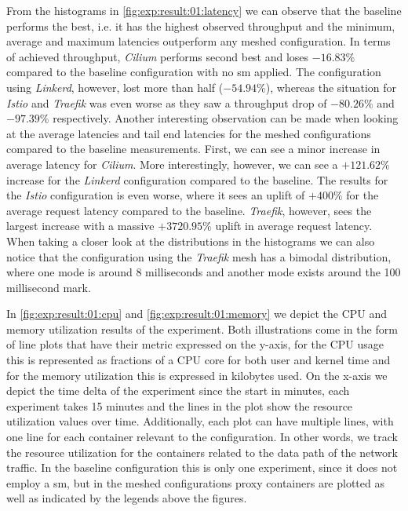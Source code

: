 From the histograms in \cref{fig:exp:result:01:latency} we can observe that the baseline performs the best, i.e. it has the highest observed throughput and the minimum, average and maximum latencies outperform any meshed configuration. In terms of achieved throughput, \textit{Cilium} performs second best and loses $-16.83\%$ compared to the baseline configuration with no \gls{sm} applied. The configuration using \textit{Linkerd}, however, lost more than half ($-54.94\%$), whereas the situation for \textit{Istio} and \textit{Traefik} was even worse as they saw a throughput drop of $-80.26\%$ and $-97.39\%$ respectively. Another interesting observation can be made when looking at the average latencies and tail end latencies for the meshed configurations compared to the baseline measurements. First, we can see a minor increase in average latency for \textit{Cilium}. More interestingly, however, we can see a $+121.62\%$ increase for the \textit{Linkerd} configuration compared to the baseline. The results for the \textit{Istio} configuration is even worse, where it sees an uplift of $+400\%$ for the average request latency compared to the baseline. \textit{Traefik}, however, sees the largest increase with a massive $+3720.95\%$ uplift in average request latency. When taking a closer look at the distributions in the histograms we can also notice that the configuration using the \textit{Traefik} mesh has a bimodal distribution, where one mode is around 8 milliseconds and another mode exists around the 100 millisecond mark.

In \cref{fig:exp:result:01:cpu} and \cref{fig:exp:result:01:memory} we depict the CPU and memory utilization results of the experiment. Both illustrations come in the form of line plots that have their metric expressed on the y-axis, for the CPU usage this is represented as fractions of a CPU core for both user and kernel time and for the memory utilization this is expressed in kilobytes used. On the x-axis we depict the time delta of the experiment since the start in minutes, each experiment takes 15 minutes and the lines in the plot show the resource utilization values over time. Additionally, each plot can have multiple lines, with one line for each container relevant to the configuration. In other words, we track the resource utilization for the containers related to the data path of the network traffic. In the baseline configuration this is only one experiment, since it does not employ a \gls{sm}, but in the meshed configurations proxy containers are plotted as well as indicated by the legends above the figures.

